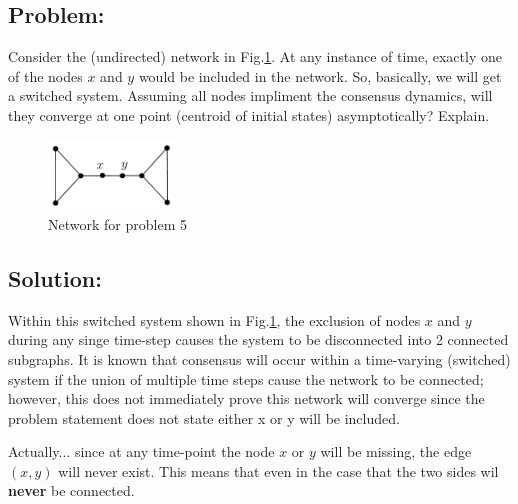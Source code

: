 \documentclass[]{article}
\numberwithin{equation}{section}
\renewcommand{\figurename}{Fig.}
\begin{document}
\subsection*{Problem:}
Consider the (undirected) network in \figurename \ref{fig:pblm5}. 
At any instance of time, exactly one of the nodes $x$ and $y$ would be included in the network. 
So, basically, we will get a switched system. 
Assuming all nodes impliment the consensus dynamics, will they converge at one point (centroid of initial states) asymptotically?
Explain.
\begin{figure}[h]
    \centering
    \includegraphics[width=0.3\textwidth]{figs/pblm5.png}
    \caption{Network for problem 5}
    \label{fig:pblm5}
\end{figure}

% 
% 


\subsection*{Solution:}
Within this switched system shown in \figurename \ref{fig:pblm5}, the exclusion of nodes $x$ and $y$ during any singe time-step causes the system to be disconnected into 2 connected subgraphs. 
It is known that consensus will occur within a time-varying (switched) system if the union of multiple time steps cause the network to be connected; 
however, this does not immediately prove this network will converge since the problem statement does not state either x or y will be included.

{\color{red}
    Actually... since at any time-point the node $x$ or $y$ will be missing, the edge $(x,y)$ will never exist.
    This means that even in the case that the two sides wil \textbf{never} be connected.
}


\newpage
\section{}
\end{document}
